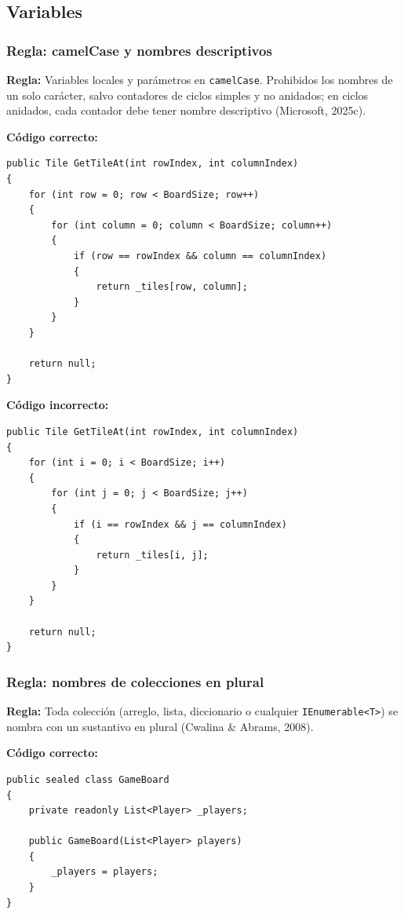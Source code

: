 \subsection{Variables}

\subsubsection{Regla: camelCase y nombres descriptivos}

\textbf{Regla:} Variables locales y parámetros en \texttt{camelCase}. Prohibidos los nombres de un solo carácter, salvo contadores de ciclos simples y no anidados; en ciclos anidados, cada contador debe tener nombre descriptivo (Microsoft, 2025c).

\textbf{Código correcto:}
\begin{lstlisting}[style=csharpstyle]
public Tile GetTileAt(int rowIndex, int columnIndex)
{
    for (int row = 0; row < BoardSize; row++)
    {
        for (int column = 0; column < BoardSize; column++)
        {
            if (row == rowIndex && column == columnIndex)
            {
                return _tiles[row, column];
            }
        }
    }

    return null;
}
\end{lstlisting}

\textbf{Código incorrecto:}
\begin{lstlisting}[style=csharpstyle]
public Tile GetTileAt(int rowIndex, int columnIndex)
{
    for (int i = 0; i < BoardSize; i++)
    {
        for (int j = 0; j < BoardSize; j++)
        {
            if (i == rowIndex && j == columnIndex)
            {
                return _tiles[i, j];
            }
        }
    }

    return null;
}
\end{lstlisting}

\subsubsection{Regla: nombres de colecciones en plural}

\textbf{Regla:} Toda colección (arreglo, lista, diccionario o cualquier \texttt{IEnumerable<T>}) se nombra con un sustantivo en plural (Cwalina \& Abrams, 2008).

\textbf{Código correcto:}
\begin{lstlisting}[style=csharpstyle]
public sealed class GameBoard
{
    private readonly List<Player> _players;

    public GameBoard(List<Player> players)
    {
        _players = players;
    }
}
\end{lstlisting}

